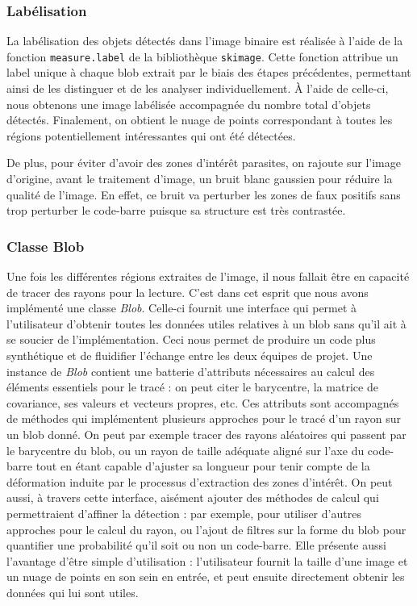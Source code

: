 \documentclass{rapport}
\begin{document}
\subsubsection*{Labélisation}
La labélisation des objets détectés dans l'image binaire est réalisée à l'aide de la fonction \texttt{measure.label} de la bibliothèque \texttt{skimage}. Cette fonction attribue un label unique à chaque blob extrait par le biais des étapes précédentes, permettant ainsi de les distinguer et de les analyser individuellement. À l'aide de celle-ci, nous obtenons une image labélisée accompagnée du nombre total d'objets détectés. Finalement, on obtient le nuage de points correspondant à toutes les régions potentiellement intéressantes qui ont été détectées.

De plus, pour éviter d'avoir des zones d'intérêt parasites, on rajoute sur l'image d'origine, avant le traitement d'image, un bruit blanc gaussien pour réduire la qualité de l'image. En effet, ce bruit va perturber les zones de faux positifs sans trop perturber le code-barre puisque sa structure est très contrastée.

\subsubsection*{Classe Blob}
Une fois les différentes régions extraites de l'image, il nous fallait être en capacité de tracer des rayons pour la lecture. C'est dans cet esprit que nous avons implémenté une classe \textit{Blob}. Celle-ci fournit une interface qui permet à l'utilisateur d'obtenir toutes les données utiles relatives à un blob sans qu'il ait à se soucier de l'implémentation. Ceci nous permet de produire un code plus synthétique et de fluidifier l'échange entre les deux équipes de projet.
\newline \newline Une instance de \textit{Blob} contient une batterie d'attributs nécessaires au calcul des éléments essentiels pour le tracé : on peut citer le barycentre, la matrice de covariance, ses valeurs et vecteurs propres, etc. Ces attributs sont accompagnés de méthodes qui implémentent plusieurs approches pour le tracé d'un rayon sur un blob donné. On peut par exemple tracer des rayons aléatoires qui passent par le barycentre du blob, ou un rayon de taille adéquate aligné sur l'axe du code-barre tout en étant capable d'ajuster sa longueur pour tenir compte de la déformation induite par le processus d'extraction des zones d'intérêt.
\newline \newline On peut aussi, à travers cette interface, aisément ajouter des méthodes de calcul qui permettraient d'affiner la détection : par exemple, pour utiliser d'autres approches pour le calcul du rayon, ou l'ajout de filtres sur la forme du blob pour quantifier une probabilité qu'il soit ou non un code-barre. Elle présente aussi l'avantage d'être simple d'utilisation : l'utilisateur fournit la taille d'une image et un nuage de points en son sein en entrée, et peut ensuite directement obtenir les données qui lui sont utiles.
\end{document}
